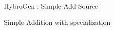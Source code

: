 \begin{Frame}{HybroGen : Simple-Add-Source}
    \begin{block}{Simple Addition with specialization}
      
    \end{block}
\end{Frame}
